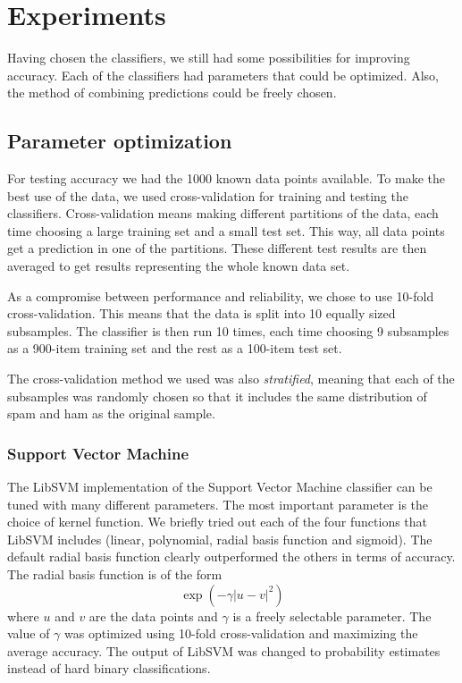 \section{Experiments} \label{sec:experiments}

Having chosen the classifiers, we still had some possibilities for
improving accuracy. Each of the classifiers had parameters that could be
optimized. Also, the method of combining predictions could be freely
chosen.

\subsection{Parameter optimization}

For testing accuracy we had the 1000 known data points available. To
make the best use of the data, we used cross-validation for training and
testing the classifiers. Cross-validation means making different
partitions of the data, each time choosing a large training set and a
small test set. This way, all data points get a prediction in one of the
partitions. These different test results are then averaged to get
results representing the whole known data set.

As a compromise between performance and reliability, we chose to use
10-fold cross-validation. This means that the data is split into 10
equally sized subsamples. The classifier is then run 10 times, each time
choosing 9 subsamples as a 900-item training set and the rest as a
100-item test set.

The cross-validation method we used was also \emph{stratified}, meaning
that each of the subsamples was randomly chosen so that it includes the
same distribution of spam and ham as the original sample.

\subsubsection{Support Vector Machine}

The LibSVM implementation of the Support Vector Machine classifier can
be tuned with many different parameters. The most important parameter is
the choice of kernel function. We briefly tried out each of the four
functions that LibSVM includes (linear, polynomial, radial basis
function and sigmoid). The default radial basis function clearly
outperformed the others in terms of accuracy. The radial basis function
is of the form
\begin{equation}
\exp(-\gamma |u-v|^2)
\end{equation}
where $u$ and $v$ are the data points and $\gamma$ is a freely
selectable parameter. The value of $\gamma$ was optimized using 10-fold
cross-validation and maximizing the average accuracy. The output of
LibSVM was changed to probability estimates instead of hard binary
classifications.

